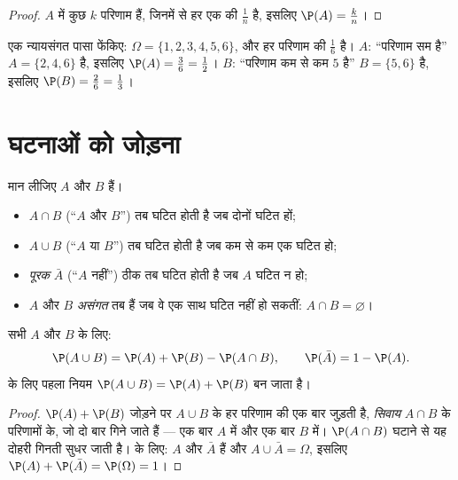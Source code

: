 \begin{proof}
$A$ में कुछ $k$ परिणाम हैं, जिनमें से हर एक की  $\frac1n$ है, इसलिए
$\P(A) = \frac kn$।
\end{proof}

\begin{example}\label{ex:g10:proba:die}
एक न्यायसंगत पासा फेंकिए: $\Omega = \{1, 2, 3, 4, 5, 6\}$, और हर परिणाम की  $\frac16$ है। 
$A$: ``परिणाम सम है'' $A = \{2, 4, 6\}$ है, इसलिए $\P(A) = \frac36 = \frac12$।  $B$: ``परिणाम कम से कम
$5$ है'' $B = \{5, 6\}$ है, इसलिए $\P(B) = \frac26 =
\frac13$।
\end{example}

\section{घटनाओं को जोड़ना}

\begin{definition}[प्रतिच्छेदन, सम्मिलन, पूरक]\label{def:g10:proba:operations}
मान लीजिए $A$ और $B$  हैं।
\begin{itemize}
  \item $A \cap B$ (``$A$ और $B$'') तब घटित होती है जब दोनों घटित हों;
  \item $A \cup B$ (``$A$ या $B$'') तब घटित होती है जब कम से कम एक घटित हो;
  \item \emph{पूरक} $\bar A$ (``$A$ नहीं'') ठीक तब घटित होती है
        जब $A$ घटित न हो;
  \item $A$ और $B$ \emph{असंगत} तब हैं जब वे एक साथ घटित
        नहीं हो सकतीं: $A \cap B = \varnothing$।
\end{itemize}
\end{definition}

\begin{theorem}[योग के नियम]\label{thm:g10:proba:addition}
सभी  $A$ और $B$ के लिए:
\[
\P(A \cup B) = \P(A) + \P(B) - \P(A \cap B),
\qquad
\P(\bar A) = 1 - \P(A) .
\]
  के लिए पहला नियम $\P(A \cup B) = \P(A) + \P(B)$ बन जाता है।
\end{theorem}

\begin{proof}
$\P(A) + \P(B)$ जोड़ने पर $A \cup B$ के हर परिणाम की  एक बार जुड़ती है,
\emph{सिवाय} $A \cap B$ के परिणामों के, जो दो बार गिने जाते हैं --- एक बार $A$
में और एक बार $B$ में। $\P(A \cap B)$ घटाने से यह दोहरी गिनती सुधर जाती है।  के
लिए: $A$ और $\bar A$  हैं और $A \cup \bar A = \Omega$, इसलिए $\P(A) + \P(\bar A) = \P(\Omega) = 1$।
\end{proof}

